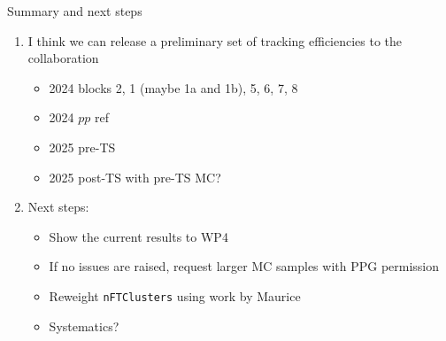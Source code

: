 \documentclass[xcolor={dvipsnames}]{beamer}
\begin{document}
\begin{frame}{Summary and next steps}
  \vspace{0.0cm}
  \begin{enumerate}
    \setlength\itemsep{0.4em}
    \item{I think we can release a preliminary set of tracking efficiencies to the collaboration}
    \begin{itemize}
      \item{2024 blocks 2, 1 (maybe 1a and 1b), 5, 6, 7, 8}
      \item{2024 $pp$ ref}
      \item{2025 pre-TS}
      \item{2025 post-TS with pre-TS MC?}
    \end{itemize}
    \item{Next steps:}
    \begin{itemize}
      \item{Show the current results to WP4}
      \item{If no issues are raised, request larger MC samples with PPG permission}
      \item{Reweight \texttt{nFTClusters} using work by Maurice}
      \item{Systematics?}
    \end{itemize}
  \end{enumerate}
\end{frame}
\end{document}
